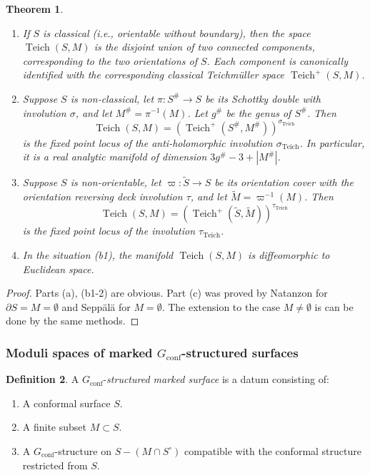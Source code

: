 \documentclass[english,11pt,leqno]{article}
\def\conf{{\on{conf}}}
\def\on{\operatorname}
\def\Teich{\on{Teich}}
\newtheorem{thm}{Theorem}[section]
\theoremstyle{definition}
\newtheorem{defi}[thm]{Definition}
\theoremstyle{remark}
\numberwithin{equation}{section}
\begin{document}
\begin{thm}\label{thm:klein-teich}
\begin{enumerate}
\item[(a)] If $S$ is classical (i.e., orientable without boundary), then the space $\Teich(S,M)$ is the disjoint union of
two connected components, corresponding to the two orientations of $S$. Each component is canonically
identified with the corresponding classical Teichm\"uller space $\Teich^+(S,M)$. 

\item[(b1)] Suppose $S$ is non-classical, let $\pi: S^\#\to S$ be its Schottky double with involution
$\sigma$, and let $M^\#=\pi^{-1}(M)$. Let $g^\#$ be the genus of $S^\#$. Then
\[
\Teich(S,M) =  (\Teich^+(S^\#, M^\#))^{\sigma_{\Teich}}
\]
is the fixed point locus of the anti-holomorphic involution $\sigma_{\Teich}$. 
In particular, it is a real analytic manifold of dimension $3g^\#-3+|M^\#|$. 

\item[(b2)] Suppose $S$ is non-orientable, let $\varpi: \widetilde S\to S$ be its
orientation cover with the orientation reversing deck involution $\tau$, and let $\widetilde M=\varpi^{-1}(M)$.
Then
\[
	\Teich(S,M) = (\Teich^+(\widetilde S, \widetilde M))^{\tau_{\Teich}}
\]
is the fixed point locus of the involution $\tau_{\Teich}$. 

\item[(c)] In the situation (b1), the manifold $\Teich(S,M)$ is diffeomorphic to Euclidean space.

\end{enumerate}
\end{thm}

\begin{proof} Parts (a), (b1-2) are obvious. Part (c) was proved by Natanzon \cite{natanzon}
for $\partial S = M=\emptyset$ and Sepp\"al\"a \cite{seppala} for $M=\emptyset$. The extension 
to the case $M\neq\emptyset$ is can be done by the same methods.
\end{proof}

\subsubsection {Moduli spaces of marked $G_\conf$-structured surfaces}


\begin{defi}
A $G_\conf$-{\em structured marked surface} is a datum consisting of:
\begin{enumerate}
\item[(1)] A conformal surface $S$.

\item[(2)] A finite subset $M\subset S$.

\item[(3)] A $G_\conf$-structure on $S-(M\cap S^\circ)$ compatible with the conformal
structure restricted from $S$. 
\end{enumerate}
\end{defi} 
\end{document}
